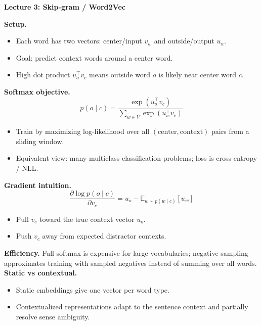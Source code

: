 \documentclass[letterpaper,landscape]{article}
\newcommand{\secbar}[1]{\vspace{1pt}\colorbox{black!12}{\parbox{\linewidth}{\textbf{#1}}}\vspace{1pt}}
\newcommand{\mini}[1]{\textbf{#1}}
\newcommand{\eqline}[1]{\[
\displaystyle #1
\]}
\begin{document}
\begin{minipage}[t]{0.325\textwidth}
\secbar{Lecture 3: Skip-gram / Word2Vec}
\mini{Setup.}
\begin{itemize}
\item Each word has two vectors: center/input $v_w$ and outside/output $u_w$.
\item Goal: predict context words around a center word.
\item High dot product $u_o^\top v_c$ means outside word $o$ is likely near center word $c$.
\end{itemize}

\mini{Softmax objective.}
\eqline{p(o\mid c)=\frac{\exp(u_o^\top v_c)}{\sum_{w\in V}\exp(u_w^\top v_c)}}
\begin{itemize}
\item Train by maximizing log-likelihood over all $(\text{center},\text{context})$ pairs from a sliding window.
\item Equivalent view: many multiclass classification problems; loss is cross-entropy / NLL.
\end{itemize}

\mini{Gradient intuition.}
\eqline{\frac{\partial \log p(o\mid c)}{\partial v_c}=u_o-\mathbb{E}_{w\sim p(w\mid c)}[u_w]}
\begin{itemize}
\item Pull $v_c$ toward the true context vector $u_o$.
\item Push $v_c$ away from expected distractor contexts.
\end{itemize}

\mini{Efficiency.} Full softmax is expensive for large vocabularies; negative sampling approximates training with sampled negatives instead of summing over all words.
\mini{Static vs contextual.}
\begin{itemize}
\item Static embeddings give one vector per word type.
\item Contextualized representations adapt to the sentence context and partially resolve sense ambiguity.
\end{itemize}
\end{minipage}\hfill
\end{document}
